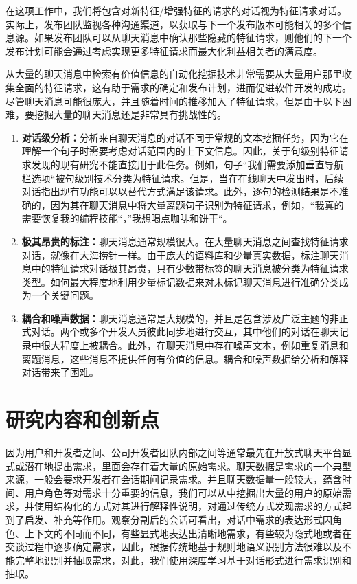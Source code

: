 在这项工作中，我们将包含对新特征/增强特征的请求的对话视为特征请求对话。实际上，发布团队监视各种沟通渠道，以获取与下一个发布版本可能相关的多个信息源。如果发布团队可以从聊天消息中确认那些隐藏的特征请求，则他们的下一个发布计划可能会通过考虑实现更多特征请求而最大化利益相关者的满意度。

从大量的聊天消息中检索有价值信息的自动化挖掘技术非常需要从大量用户那里收集全面的特征请求，这有助于需求的确定和发布计划，进而促进软件开发的成功。尽管聊天消息可能很庞大，并且随着时间的推移加入了特征请求，但是由于以下困难，要挖掘大量的聊天消息还是非常具有挑战性的。
\begin{enumerate}
    \item \textbf{对话级分析：}分析来自聊天消息的对话不同于常规的文本挖掘任务，因为它在理解一个句子时需要考虑对话范围内的上下文信息。因此，关于句级别特征请求发现的现有研究不能直接用于此任务。例如，句子“我们需要添加垂直导航栏选项“被句级别技术分类为特征请求。但是，当在在线聊天中发出时，后续对话指出现有功能可以以替代方式满足该请求。此外，逐句的检测结果是不准确的，因为其在聊天消息中将大量离题句子识别为特征请求，例如，“我真的需要恢复我的编程技能“，”我想喝点咖啡和饼干“。
    \item \textbf{极其昂贵的标注：}聊天消息通常规模很大。在大量聊天消息之间查找特征请求对话，就像在大海捞针一样。由于庞大的语料库和少量真实数据，标注聊天消息中的特征请求对话极其昂贵，只有少数带标签的聊天消息被分类为特征请求类型。如何最大程度地利用少量标记数据来对未标记聊天消息进行准确分类成为一个关键问题。
    \item \textbf{耦合和噪声数据：}聊天消息通常是大规模的，并且是包含涉及广泛主题的非正式对话。两个或多个开发人员彼此同步地进行交互，其中他们的对话在聊天记录中很大程度上被耦合。此外，在聊天消息中存在噪声文本，例如重复消息和离题消息，这些消息不提供任何有价值的信息。耦合和噪声数据给分析和解释对话带来了困难。
\end{enumerate}

\section{研究内容和创新点}

因为用户和开发者之间、公司开发者团队内部之间等通常最先在开放式聊天平台显式或潜在地提出需求，里面会存在着大量的原始需求。聊天数据是需求的一个典型来源，一般会要求开发者在会话期间记录需求。并且聊天数据量一般较大，蕴含时间、用户角色等对需求十分重要的信息，我们可以从中挖掘出大量的用户的原始需求，并使用结构化的方式对其进行解释性说明，对通过传统方式发现需求的方式起到了启发、补充等作用。观察分割后的会话可看出，对话中需求的表达形式因角色、上下文的不同而不同，有些显式地表达出清晰地需求，有些较为隐式地或者在交谈过程中逐步确定需求，因此，根据传统地基于规则地语义识别方法很难以及不能完整地识别并抽取需求，对此，我们使用深度学习基于对话形式进行需求识别和抽取。


